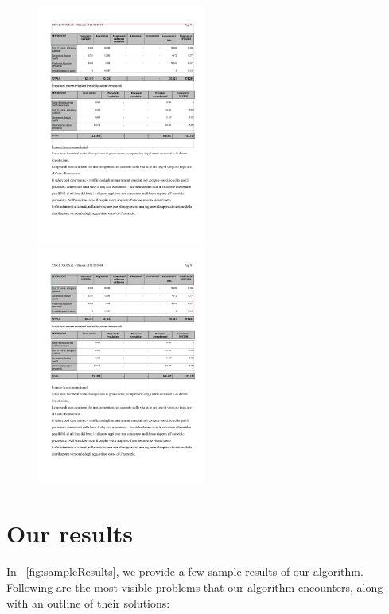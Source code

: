 \begin{figure}[t]
\centering

\includegraphics[width=15em]{img/results/tableFind2Tess.jpg}
\includegraphics[width=15em]{img/results/tableFind2Us.png}

\caption{}
\label{fig:tableFindComparison_Ours}
\end{figure}

\section{Our results}

In ~\cref{fig:sampleResults}, we provide a few sample results of our algorithm. Following are the most visible problems that our algorithm encounters, along with an outline of their solutions:


